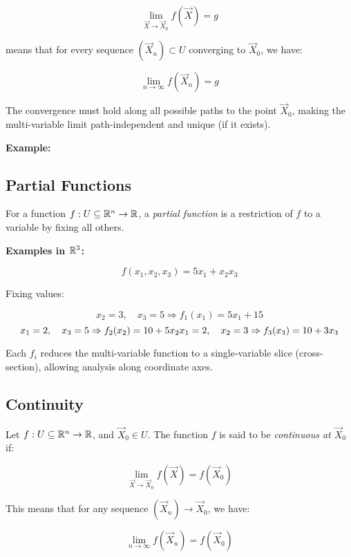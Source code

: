 \[
    \lim_{\vec{X} \to \vec{X}_0} f(\vec{X}) = g
\]

means that for every sequence \( (\vec{X}_n) \subset U \) converging to \( \vec{X}_0 \), we have:

\[
    \lim_{n \to \infty} f(\vec{X}_n) = g
\]

The convergence must hold along all possible paths to the point \( \vec{X}_0 \), making the 
multi-variable limit path-independent and unique (if it exists).
\vspace{\baselineskip}

\textbf{Example:}
\vspace{\baselineskip}


\subsection{Partial Functions}

For a function \( f: U \subseteq \mathbb{R}^n \to \mathbb{R} \), a \emph{partial function} is a 
restriction of \( f \) to a variable by fixing all others.
\vspace{\baselineskip}

\textbf{Examples in \( \mathbb{R}^3 \):}

\[
    f(x_1, x_2, x_3) = 5x_1 + x_2 x_3
\]

Fixing values:

\[
    x_2 = 3, \quad x_3 = 5 \Rightarrow f_1(x_1) = 5x_1 + 15 
\]
\[
    x_1 = 2, \quad x_3 = 5 \Rightarrow f_2(x_2) = 10 + 5x_2 \\
    x_1 = 2, \quad x_2 = 3 \Rightarrow f_3(x_3) = 10 + 3x_3
\]

Each \( f_i \) reduces the multi-variable function to a single-variable slice (cross-section), 
allowing analysis along coordinate axes.


\subsection{Continuity}

Let \( f : U \subseteq \mathbb{R}^n \to \mathbb{R} \), and \( \vec{X}_0 \in U \). The function 
\(f\) is said to be \emph{continuous at \( \vec{X}_0 \)} if:

\[
    \lim_{\vec{X} \to \vec{X}_0} f(\vec{X}) = f(\vec{X}_0)
\]

This means that for any sequence \( (\vec{X}_n) \to \vec{X}_0 \), we have:

\[
    \lim_{n \to \infty} f(\vec{X}_n) = f(\vec{X}_0)
\]

